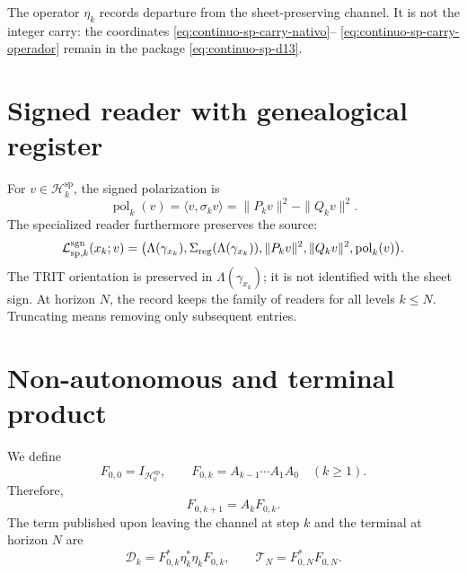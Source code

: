 The operator \(\eta_k\) records departure from the sheet-preserving channel. It
is not the integer carry: the coordinates
\eqref{eq:continuo-sp-carry-nativo}--
\eqref{eq:continuo-sp-carry-operador} remain in the package
\eqref{eq:continuo-sp-d13}.

\fi
\section{Signed reader with genealogical register}

For \(v\in\mathcal H_k^{\mathrm{sp}}\), the signed polarization is
\begin{equation}
\label{eq:continuo-sp-polarizacion-firmada}
 \operatorname{pol}_k(v)
 =\langle v,\sigma_kv\rangle
 =\|P_kv\|^2-\|Q_kv\|^2.
\end{equation}
The specialized reader furthermore preserves the source:
\begin{equation}
\label{eq:continuo-sp-lector-firmado}
 \mathcal L^{\rm sgn}_{\mathrm{sp},k}(x_k;v)
 =\bigl(
   \Lambda(\gamma_{x_k}),
   \Sigma_{\rm reg}(\Lambda(\gamma_{x_k})),
   \|P_kv\|^2,
   \|Q_kv\|^2,
   \operatorname{pol}_k(v)\bigr).
\end{equation}
The TRIT orientation is preserved in \(\Lambda(\gamma_{x_k})\); it is not
identified with the sheet sign. At horizon \(N\), the record keeps the
family of readers for all levels \(k\leq N\). Truncating means
removing only subsequent entries.

\section{Non-autonomous and terminal product}

We define
\begin{equation}
\label{eq:continuo-sp-f-producto}
 F_{0,0}=I_{\mathcal H_0^{\mathrm{sp}}},
 \qquad
 F_{0,k}=A_{k-1}\cdots A_1A_0
 \quad(k\geq1).
\end{equation}
Therefore,
\begin{equation}
\label{eq:continuo-sp-f-recursion}
 F_{0,k+1}=A_kF_{0,k}.
\end{equation}
The term published upon leaving the channel at step \(k\) and the terminal at
horizon \(N\) are
\begin{equation}
\label{eq:continuo-sp-defecto-terminal}
 \mathcal D_k=F_{0,k}^*\eta_k^*\eta_kF_{0,k},
 \qquad
 \mathcal T_N=F_{0,N}^*F_{0,N}.
\end{equation}

